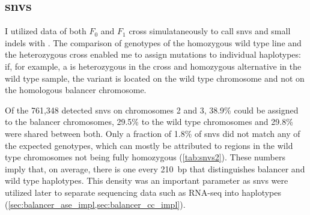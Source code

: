 \subsection{\Aclp{snv}}
\label{sec:balancer_snvs}

I utilized \wgs data of both $F_0$ and $F_1$ cross simulataneously to call
\acp{snv} and small indels with \freebayes. The comparison of genotypes of the
homozygous wild type line and the heterozygous cross enabled me to assign
mutations to individual haplotypes: if, for example, a \snv is heterozygous in
the cross and homozygous alternative in the wild type sample, the variant is
located on the wild type chromosome and not on the homologous balancer
chromosome.

Of the 761,348 detected \acp{snv} on chromosomes 2 and 3, 38.9\% could be
assigned to the balancer chromosomes, 29.5\% to the wild type chromosomes and
29.8\% were shared between both. Only a fraction of 1.8\% of \acp{snv} did not
match any of the expected genotypes, which can mostly be attributed to regions
in the wild type chromosomes not being fully homozygous (\cref{tab:snvs2}).
These numbers imply that, on average, there is one \snv every 210~bp that
distinguishes balancer and wild type haplotypes. This density was an important
parameter as \acp{snv} were utilized later to separate sequencing data such as
RNA-seq into haplotypes (\cref{sec:balancer_ase_impl,sec:balancer_cc_impl}).

